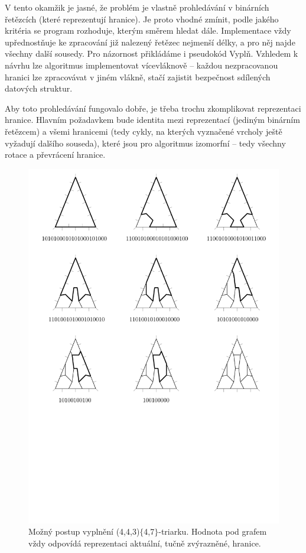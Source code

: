 V tento okamžik je jasné, že problém je vlastně prohledávání v binárních řetězcích (které reprezentují hranice). Je proto vhodné zmínit, podle jakého kritéria se program rozhoduje, kterým směrem hledat dále. Implementace vždy upřednostňuje ke zpracování již nalezený řetězec nejmenší délky, a pro něj najde všechny další sousedy. Pro názornost přikládáme i pseudokód Vyplň. Vzhledem k návrhu lze algoritmus implementovat vícevláknově -- každou nezpracovanou hranici lze zpracovávat v jiném vlákně, stačí zajistit bezpečnost sdílených datových struktur.

Aby toto prohledávání fungovalo dobře, je třeba trochu zkomplikovat reprezentaci hranice. Hlavním požadavkem bude identita mezi reprezentací (jediným binárním řetězcem) a všemi hranicemi (tedy cykly, na kterých vyznačené vrcholy ještě vyžadují dalšího souseda), které jsou pro algoritmus izomorfní -- tedy všechny rotace a převrácení hranice.


\begin{figure}[h!]\centering
\includegraphics[width=\textwidth]{../img/reseni}
\caption{Možný postup vyplnění (4,4,3)$\lbrace$4,7$\rbrace$-triarku. Hodnota pod grafem vždy odpovídá reprezentaci aktuální, tučně zvýrazněné, hranice.}
\label{obr03:reseni}
\end{figure}

